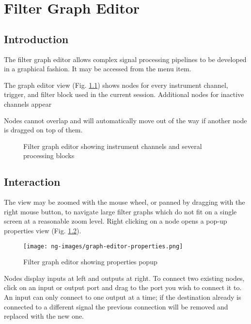 \chapter{Filter Graph Editor}
\label{grapheditor}

\section{Introduction}

The filter graph editor allows complex signal processing pipelines to be developed in a graphical fashion. It may be
accessed from the  menu item.

The graph editor view (Fig. \ref{graph-editor}) shows nodes for every instrument channel, trigger, and filter block
used in the current session. Additional nodes for inactive channels appear

Nodes cannot overlap and will automatically move out of the way if
another node is dragged on top of them.

\begin{figure}[H]
\centering
{}
\caption{Filter graph editor showing instrument channels and several processing blocks}
\label{graph-editor}
\end{figure}

\section{Interaction}

The view may be zoomed with the mouse wheel, or panned by dragging with the right mouse button, to navigate large
filter graphs which do not fit on a single screen at a reasonable zoom level. Right clicking on a node opens a pop-up
properties view (Fig. \ref{graph-editor-properties}).

\begin{figure}[H]
\centering
\texttt{[image: ng-images/graph-editor-properties.png]}
\caption{Filter graph editor showing properties popup}
\label{graph-editor-properties}
\end{figure}

Nodes display inputs at left and outputs at right. To connect two existing nodes, click on an input or output port and
drag to the port you wish to connect it to. An input can only connect to one output at a time; if the destination
already is connected to a different signal the previous connection will be removed and replaced with the new one.

